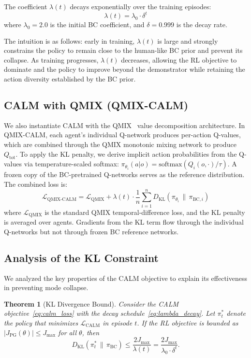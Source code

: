 \documentclass[journal]{IEEEtran}
\newtheorem{theorem}{Theorem}
\newcommand{\KL}{\mathrm{KL}}
\begin{document}
The coefficient $\lambda(t)$ decays exponentially over the training episodes:
\begin{equation}
    \lambda(t) = \lambda_0 \cdot \delta^t
    \label{eq:lambda_decay}
\end{equation}
where $\lambda_0 = 2.0$ is the initial BC coefficient, and $\delta = 0.999$ is the decay rate.

The intuition is as follows: early in training, $\lambda(t)$ is large and strongly constrains the policy to remain close to the human-like BC prior and prevent its collapse. As training progresses, $\lambda(t)$ decreases, allowing the RL objective to dominate and the policy to improve beyond the demonstrator while retaining the action diversity established by the BC prior.

\subsection{CALM with QMIX (QMIX-CALM)}

We also instantiate CALM with the QMIX~\cite{rashid2018qmix} value decomposition architecture. In QMIX-CALM, each agent's individual Q-network produces per-action Q-values, which are combined through the QMIX monotonic mixing network to produce $Q_{\text{tot}}$. To apply the KL penalty, we derive implicit action probabilities from the Q-values via temperature-scaled softmax: $\pi_{\theta_i}(a|o) = \text{softmax}(Q_i(o, \cdot)/\tau)$. A frozen copy of the BC-pretrained Q-networks serves as the reference distribution. The combined loss is:
\begin{equation}
    \mathcal{L}_{\text{QMIX-CALM}} = \mathcal{L}_{\text{QMIX}} + \lambda(t) \cdot \frac{1}{n}\sum_{i=1}^{n} D_{\KL}\!\left(\pi_{\theta_i} \,\|\, \pi_{\text{BC},i}\right)
\end{equation}
where $\mathcal{L}_{\text{QMIX}}$ is the standard QMIX temporal-difference loss, and the KL penalty is averaged over agents. Gradients from the KL term flow through the individual Q-networks but not through frozen BC reference networks.

\subsection{Analysis of the KL Constraint}

We analyzed the key properties of the CALM objective to explain its effectiveness in preventing mode collapse.

\begin{theorem}[KL Divergence Bound]
\label{thm:kl_bound}
Consider the CALM objective~\eqref{eq:calm_loss} with the decay schedule~\eqref{eq:lambda_decay}. Let $\pi_t^*$ denote the policy that minimizes $\mathcal{L}_{\text{CALM}}$ in episode $t$. If the RL objective is bounded as $|J_{\text{PG}}(\theta)| \leq J_{\max}$ for all $\theta$, then
\begin{equation}
    D_{\KL}\!\left(\pi_t^* \,\|\, \pi_{\text{BC}}\right) \leq \frac{2J_{\max}}{\lambda(t)} = \frac{2J_{\max}}{\lambda_0 \cdot \delta^t}.
    \label{eq:kl_bound}
\end{equation}
\end{theorem}
\end{document}
